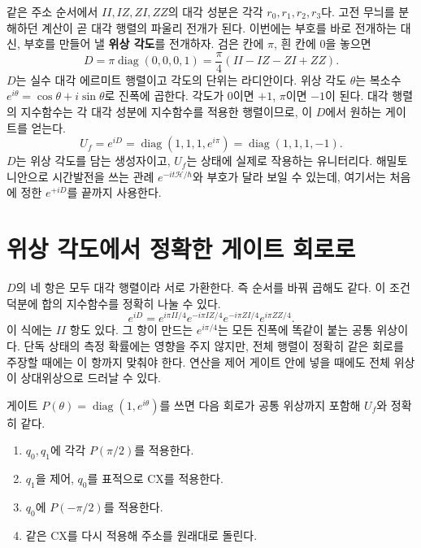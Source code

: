 같은 주소 순서에서 \(II,IZ,ZI,ZZ\)의 대각 성분은 각각
\(r_0,r_1,r_2,r_3\)다. 고전 무늬를 분해하던 계산이 곧 대각 행렬의 파울리 전개가 된다.
이번에는 부호를 바로 전개하는 대신, 부호를 만들어 낼 \textbf{위상 각도}를 전개하자.
검은 칸에 \(\pi\), 흰 칸에 0을 놓으면
\[
D=\pi\operatorname{diag}(0,0,0,1)
=\frac\pi4(II-IZ-ZI+ZZ).
\]
\(D\)는 실수 대각 에르미트 행렬이고 각도의 단위는 라디안이다.
위상 각도 \(\theta\)는 복소수 \(e^{i\theta}=\cos\theta+i\sin\theta\)로 진폭에 곱한다.
각도가 0이면 \(+1\), \(\pi\)이면 \(-1\)이 된다.
대각 행렬의 지수함수는 각 대각 성분에 지수함수를 적용한 행렬이므로,
이 \(D\)에서 원하는 게이트를 얻는다.
\[
U_f=e^{iD}=\operatorname{diag}(1,1,1,e^{i\pi})
=\operatorname{diag}(1,1,1,-1).
\]
\(D\)는 위상 각도를 담는 생성자이고, \(U_f\)는 상태에 실제로 작용하는 유니터리다.
해밀토니안으로 시간발전을 쓰는 관례 \(e^{-it\mathcal H/\hbar}\)와 부호가 달라 보일 수 있는데,
여기서는 처음에 정한 \(e^{+iD}\)를 끝까지 사용한다.

\section{위상 각도에서 정확한 게이트 회로로}

\(D\)의 네 항은 모두 대각 행렬이라 서로 가환한다.
즉 순서를 바꿔 곱해도 같다. 이 조건 덕분에 합의 지수함수를 정확히 나눌 수 있다.
\[
e^{iD}=e^{i\pi II/4}e^{-i\pi IZ/4}
e^{-i\pi ZI/4}e^{i\pi ZZ/4}.
\]
이 식에는 \(II\) 항도 있다. 그 항이 만드는 \(e^{i\pi/4}\)는
모든 진폭에 똑같이 붙는 공통 위상이다.
단독 상태의 측정 확률에는 영향을 주지 않지만, 전체 행렬이 정확히 같은 회로를
주장할 때에는 이 항까지 맞춰야 한다. 연산을 제어 게이트 안에 넣을 때에도
전체 위상이 상대위상으로 드러날 수 있다.

게이트 \(P(\theta)=\operatorname{diag}(1,e^{i\theta})\)를 쓰면 다음 회로가
공통 위상까지 포함해 \(U_f\)와 정확히 같다.
\begin{enumerate}
\item \(q_0,q_1\)에 각각 \(P(\pi/2)\)를 적용한다.
\item \(q_1\)을 제어, \(q_0\)를 표적으로 CX를 적용한다.
\item \(q_0\)에 \(P(-\pi/2)\)를 적용한다.
\item 같은 CX를 다시 적용해 주소를 원래대로 돌린다.
\end{enumerate}


